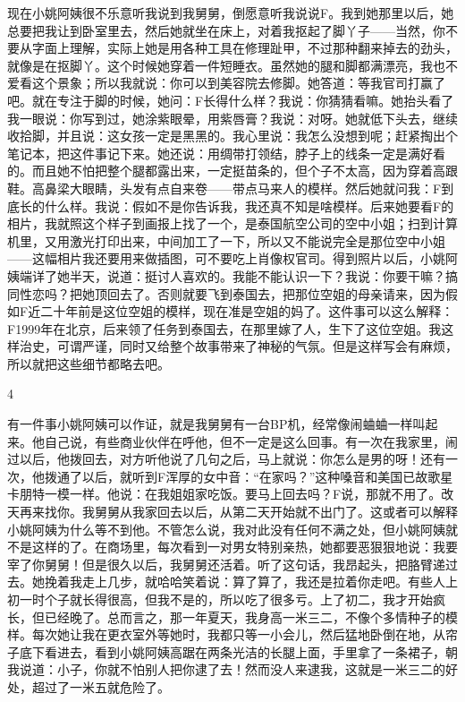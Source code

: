 现在小姚阿姨很不乐意听我说到我舅舅，倒愿意听我说说F。我到她那里以后，她总要把我让到卧室里去，然后她就坐在床上，对着我抠起了脚丫子——当然，你不要从字面上理解，实际上她是用各种工具在修理趾甲，不过那种翻来掉去的劲头，就像是在抠脚丫。这个时候她穿着一件短睡衣。虽然她的腿和脚都满漂亮，我也不爱看这个景象；所以我就说：你可以到美容院去修脚。她答道：等我官司打赢了吧。就在专注于脚的时候，她问：F长得什么样？我说：你猜猜看嘛。她抬头看了我一眼说：你写到过，她涂紫眼晕，用紫唇膏？我说：对呀。她就低下头去，继续收拾脚，并且说：这女孩一定是黑黑的。我心里说：我怎么没想到呢；赶紧掏出个笔记本，把这件事记下来。她还说：用绸带打领结，脖子上的线条一定是满好看的。而且她不怕把整个腿都露出来，一定挺苗条的，但个子不太高，因为穿着高跟鞋。高鼻梁大眼睛，头发有点自来卷——带点马来人的模样。然后她就问我：F到底长的什么样。我说：假如不是你告诉我，我还真不知是啥模样。后来她要看F的相片，我就照这个样子到画报上找了一个，是泰国航空公司的空中小姐；扫到计算机里，又用激光打印出来，中间加工了一下，所以又不能说完全是那位空中小姐——这幅相片我还要用来做插图，可不要吃上肖像权官司。得到照片以后，小姚阿姨端详了她半天，说道：挺讨人喜欢的。我能不能认识一下？我说：你要干嘛？搞同性恋吗？把她顶回去了。否则就要飞到泰国去，把那位空姐的母亲请来，因为假如F近二十年前是这位空姐的模样，现在准是空姐的妈了。这件事可以这么解释：F1999年在北京，后来领了任务到泰国去，在那里嫁了人，生下了这位空姐。我这样治史，可谓严谨，同时又给整个故事带来了神秘的气氛。但是这样写会有麻烦，所以就把这些细节都略去吧。 

4 

有一件事小姚阿姨可以作证，就是我舅舅有一台BP机，经常像闹蛐蛐一样叫起来。他自己说，有些商业伙伴在呼他，但不一定是这么回事。有一次在我家里，闹过以后，他拨回去，对方听他说了几句之后，马上就说：你怎么是男的呀！还有一次，他拨通了以后，就听到F浑厚的女中音：“在家吗？”这种嗓音和美国已故歌星卡朋特一模一样。他说：在我姐姐家吃饭。要马上回去吗？F说，那就不用了。改天再来找你。我舅舅从我家回去以后，从第二天开始就不出门了。这或者可以解释小姚阿姨为什么等不到他。不管怎么说，我对此没有任何不满之处，但小姚阿姨就不是这样的了。在商场里，每次看到一对男女特别亲热，她都要恶狠狠地说：我要宰了你舅舅！但是很久以后，我舅舅还活着。听了这句话，我昂起头，把胳臂递过去。她挽着我走上几步，就哈哈笑着说：算了算了，我还是拉着你走吧。有些人上初一时个子就长得很高，但我不是的，所以吃了很多亏。上了初二，我才开始疯长，但已经晚了。总而言之，那一年夏天，我身高一米三二，不像个多情种子的模样。每次她让我在更衣室外等她时，我都只等一小会儿，然后猛地卧倒在地，从帘子底下看进去，看到小姚阿姨高踞在两条光洁的长腿上面，手里拿了一条裙子，朝我说道：小子，你就不怕别人把你逮了去！然而没人来逮我，这就是一米三二的好处，超过了一米五就危险了。 

